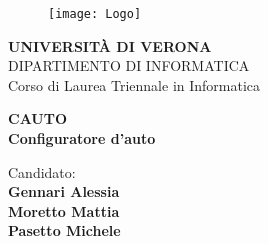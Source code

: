 \begin{titlepage}
    \begin{figure}[htb]
        \centering
        \texttt{[image: Logo]}
        \vspace{2mm}
    \end{figure}
    
    \begin{center}
        \LARGE{\bf UNIVERSITÀ DI VERONA}
        \vspace{2mm}
        \\ \large{DIPARTIMENTO DI INFORMATICA }
        \vspace{5mm}
        \\ \LARGE{Corso di Laurea Triennale in Informatica}
    \end{center}
    
    \vspace{15mm}
    \begin{center}
        {\LARGE{\bf CAUTO\\\vspace{5mm}Configuratore d'auto}}
    \end{center}
    \vspace{20mm}
    
    \begin{center}
        {\large{Candidato:\\}
            \large\bf{
                Gennari Alessia\\ 
                \vspace{1mm}
                Moretto Mattia\\ 
                \vspace{1mm}
                Pasetto Michele\\%
            }
        }
    \end{center}
    
    \vspace{\fill}
    
    \end{titlepage}